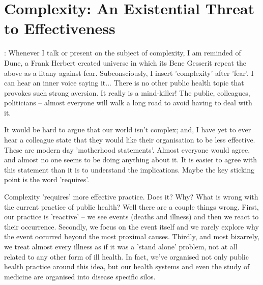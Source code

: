 \chapter*{Complexity: An Existential Threat to Effectiveness}



: Whenever I talk or present on the subject of complexity, I am reminded of Dune, a Frank Herbert created universe in which its Bene Gesserit repeat the above as a litany against fear. Subconsciously, I insert 'complexity' after 'fear'. I can hear an inner voice saying it... There is no other public health topic that provokes such strong aversion. It really is a mind-killer! The public, colleagues, politicians -- almost everyone will walk a long road to avoid having to deal with it.

It would be hard to argue that our world isn't complex; and, I have yet to ever hear a colleague state that they would like their organisation to be less effective. These are modern day 'motherhood statements'. Almost everyone would agree, and almost no one seems to be doing anything about it. It is easier to agree with this statement than it is to understand the implications. Maybe the key sticking point is the word 'requires'.

Complexity 'requires' more effective practice. Does it? Why? What is wrong with the current practice of public health? Well there are a couple things wrong. First, our practice is 'reactive' -- we see events (deaths and illness) and then we react to their occurrence. Secondly, we focus on the event itself and we rarely explore why the event occurred beyond the most proximal causes. Thirdly, and most bizarrely, we treat almost every illness as if it was a 'stand alone' problem, not at all related to any other form of ill health. In fact, we've organised not only public health practice around this idea, but our health systems and even the study of medicine are organised into disease specific silos. 

